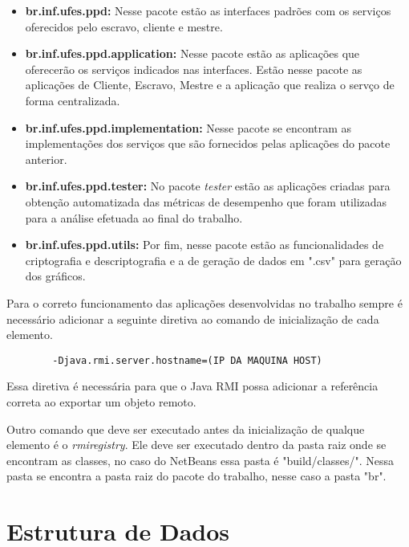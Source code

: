 \documentclass[
	12pt,				%
    oneside,			%
	a4paper,			%
	english,			%
	brazil,				%
	]{abntex2}
\begin{document}
\begin{itemize}

	\item \textbf{br.inf.ufes.ppd:} Nesse pacote estão as interfaces padrões com os serviços oferecidos pelo escravo,
	cliente e mestre.
	
	\item \textbf{br.inf.ufes.ppd.application:} Nesse pacote estão as aplicações que oferecerão os serviços indicados nas  
	interfaces. Estão nesse pacote as aplicações de Cliente, Escravo, Mestre e a aplicação que realiza o servço de forma
	centralizada.

	\item \textbf{br.inf.ufes.ppd.implementation:} Nesse pacote se encontram as implementações dos serviços que são 
	fornecidos pelas aplicações do pacote anterior.
	
	\item \textbf{br.inf.ufes.ppd.tester:} No pacote \textit{tester} estão as aplicações criadas para obtenção automatizada
	das 	métricas de desempenho que foram utilizadas para a análise efetuada ao final do trabalho.
	
	\item \textbf{br.inf.ufes.ppd.utils:} Por fim, nesse pacote estão as funcionalidades de criptografia e descriptografia e 
	a de geração de dados em ".csv" para geração dos gráficos.
		

\end{itemize}

Para o correto funcionamento das aplicações desenvolvidas no trabalho sempre é necessário adicionar a seguinte diretiva ao comando de inicialização de cada elemento.

\begin{center}
	\begin{lstlisting}
		-Djava.rmi.server.hostname=(IP DA MAQUINA HOST)\end{lstlisting}
\end{center}

Essa diretiva é necessária para que o Java RMI possa adicionar a referência correta ao exportar um objeto remoto. 

Outro comando que deve ser executado antes da inicialização de qualque elemento é o \textit{rmiregistry}. Ele deve ser
executado dentro da pasta raiz onde se encontram as classes, no caso do NetBeans essa pasta é "build/classes/".
Nessa pasta se encontra a pasta raiz do pacote do trabalho, nesse caso a pasta "br".

\section{Estrutura de Dados}
\end{document}
